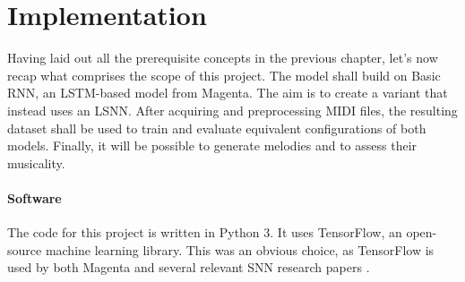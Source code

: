 \documentclass[../../report.tex]{subfiles}
\begin{document}
\chapter{Implementation}

Having laid out all the prerequisite concepts in the previous chapter, let's now
recap what comprises the scope of this project. The model shall build on Basic
RNN, an LSTM-based model from Magenta. The aim is to create a variant that
instead uses an LSNN. After acquiring and preprocessing MIDI files, the
resulting dataset shall be used to train and evaluate equivalent configurations
of both models. Finally, it will be possible to generate melodies and to assess
their musicality.

\subsubsection{Software}
The code for this project is written in Python 3. It uses TensorFlow, an
open-source machine learning library. This was an obvious choice, as TensorFlow
is used by both Magenta and several relevant SNN research papers
\cite{Bellec2018LSNN, Bellec2020}.


\end{document}
